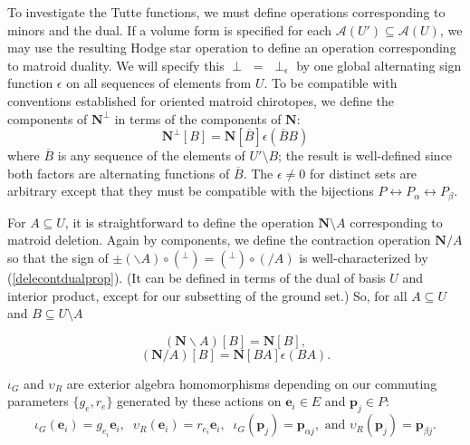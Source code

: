 \documentclass[Unicode]{cedram-alco}
\newcommand{\ext}[1]{\ensuremath{\mathbf{#1}}}
\newcommand{\Is}{\ensuremath{\iota}}
\newcommand{\Vs}{\ensuremath{\upsilon}}
\begin{document}
To investigate the Tutte functions, we must
define operations corresponding to minors and the dual.
If a volume form is specified for each $\mathcal{A}(U')\subseteq\mathcal{A}(U)$,
we may use the resulting Hodge star operation to define an operation
corresponding to matroid duality.  We will specify this
$\perp$ $=$ $\perp_\epsilon$ by one global
alternating sign function $\epsilon$  on all sequences of
elements from $U$.  To be compatible with conventions established
for oriented matroid chirotopes\cite{OMBOOK}, we define 
the components of $\ext{N}^\perp$ in terms of the
components of $\ext{N}$:
\begin{equation}\label{dualdefinition}
  \ext{N}^\perp[B] = \ext{N}[\overline{B}]\epsilon(\overline{B}B)
\end{equation}
where $\overline{B}$ is any sequence of the elements of $U'\setminus B$;
the result is well-defined since both factors are alternating
functions of $\overline{B}$.  The $\epsilon\neq 0$ for distinct sets
are arbitrary except that they must be compatible with
the bijections
$P \leftrightarrow P_{\alpha}\leftrightarrow P_{\beta}$.

For $A\subseteq U$, it is straightforward to
define the operation $\ext{N}\setminus A$ corresponding to matroid
deletion.  Again by components, we define the 
contraction operation $\ext{N}/A$
so that the sign of $\pm(\backslash A)\circ(^\perp)=(^\perp)\circ(/ A)$
is well-characterized by (\ref{delecontdualprop}).  (It can be
defined in terms
of the dual of basis $U$ and interior product\cite{MarcusFDMuAlPt2},
except for our
subsetting of the ground set.) So, for all $A\subseteq U$ and
$B\subseteq U \setminus A$
\begin{defi}\label{extmatdefs}
  \begin{equation}\label{deletion-definition}
  (\ext{N}\backslash A)[B] = \ext{N}[B],
\end{equation}
\begin{equation}\label{contraction-definition}
  (\ext{N}/A)[B] = \ext{N}[BA]\epsilon(BA).
\end{equation}
\end{defi}


\begin{defi}\label{iGvRdefs}
  $\Is_G$ and $\Vs_R$ are exterior algebra homomorphisms depending on our commuting parameters
  $\{g_e, r_e\}$ generated by
  these actions on $\ext{e}_i\in E$ and $\ext{p}_j\in P$:
  \[
  \Is_G(\ext{e}_i)= g_{e_i}\ext{e}_i,\;\; \Vs_R(\ext{e}_i)=r_{e_i}\ext{e}_i,\;\;
  \Is_G(\ext{p}_j)=\ext{p}_{\alpha j}, \text{ and }  \Vs_R(\ext{p}_j)=\ext{p}_{\beta j}.
  \]
\end{defi}
\end{document}
